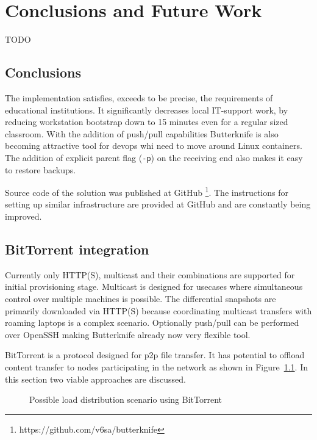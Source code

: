 \documentclass[a4paper,11pt]{kth-mag}
\begin{document}
%
%
%
%
\chapter{Conclusions and Future Work}
\label{chap:conc}

TODO



\section{Conclusions}

The implementation satisfies, exceeds to be precise,
the requirements of educational institutions.
It significantly decreases local IT-support work,
by reducing workstation bootstrap down to 15 minutes even for
a regular sized classroom.
With the addition of push/pull capabilities
Butterknife is also becoming attractive tool
for devops whi need to move around Linux containers.
The addition of explicit parent flag (\texttt{-p}) on
the receiving end also makes it easy to
restore backups.

Source code of the solution was published at GitHub
\footnote{https://github.com/v6sa/butterknife}.
The instructions for setting up similar infrastructure
are provided at GitHub and are constantly being improved.


\section{BitTorrent integration}

Currently only HTTP(S), multicast and their combinations are supported
for initial provisioning stage.
Multicast is designed for usecases where simultaneous
control over multiple machines is possible.
The differential snapshots are primarily downloaded
via HTTP(S) because coordinating multicast
transfers with roaming laptops is a complex scenario.
Optionally push/pull can be performed over OpenSSH
making Butterknife already now very flexible tool.

BitTorrent is a protocol designed for \gls{p2p} file transfer.
It has potential to offload content transfer to nodes
participating in the network as shown in
Figure~\ref{fig:butterknife-usecase-bittorrent}.
In this section two viable approaches are discussed.

\begin{figure}[!htb]
\centering
\scalebox{0.5}{}
\caption{Possible load distribution scenario using BitTorrent}
\label{fig:butterknife-usecase-bittorrent}
\end{figure}
\end{document}
